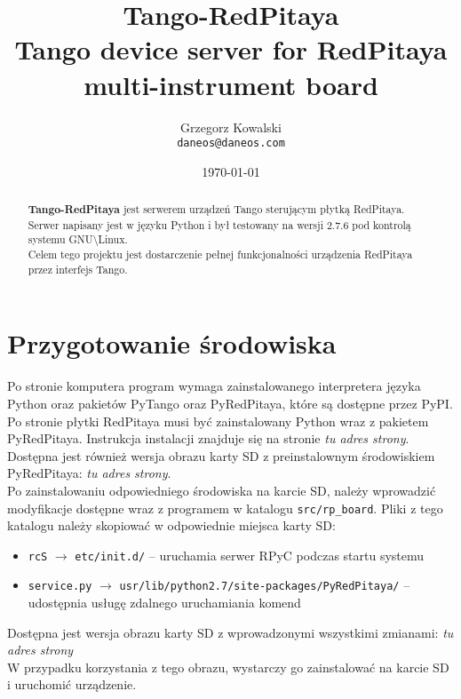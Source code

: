 \documentclass[12pt,a4paper]{article}
\title{Tango-RedPitaya\\\small{Tango device server for RedPitaya multi-instrument board}}
\author{Grzegorz Kowalski\\\texttt{daneos@daneos.com}}
\date{\today}
\begin{document}
	\maketitle
	\vspace{4em}
	
	\begin{abstract}
		\textbf{Tango-RedPitaya} jest serwerem urządzeń Tango sterującym płytką RedPitaya.\\
		Serwer napisany jest w języku Python i był testowany na wersji 2.7.6 pod kontrolą systemu GNU\textbackslash Linux.\\
		Celem tego projektu jest dostarczenie pełnej funkcjonalności urządzenia RedPitaya przez interfejs Tango.
	\end{abstract}

	\newpage
	\section{Przygotowanie środowiska}
	Po stronie komputera program wymaga zainstalowanego interpretera języka Python oraz pakietów PyTango oraz PyRedPitaya, które są dostępne przez PyPI.\\
	Po stronie płytki RedPitaya musi być zainstalowany Python wraz z pakietem PyRedPitaya. Instrukcja instalacji znajduje się na stronie \emph{tu adres strony}.\\
	Dostępna jest również wersja obrazu karty SD z preinstalownym środowiskiem PyRedPitaya: \emph{tu adres strony}.\\
	Po zainstalowaniu odpowiedniego środowiska na karcie SD, należy wprowadzić modyfikacje dostępne wraz z programem w katalogu \texttt{src/rp\_board}.
	Pliki z tego katalogu należy skopiować w odpowiednie miejsca karty SD:
	\begin{itemize}
		\item \texttt{rcS} $\to$ \texttt{etc/init.d/} -- uruchamia serwer RPyC podczas startu systemu
		\item \texttt{service.py} $\to$ \texttt{usr/lib/python2.7/site-packages/PyRedPitaya/} -- udostępnia usługę zdalnego uruchamiania komend
	\end{itemize}
	Dostępna jest wersja obrazu karty SD z wprowadzonymi wszystkimi zmianami: \emph{tu adres strony}\\
	W przypadku korzystania z tego obrazu, wystarczy go zainstalować na karcie SD i uruchomić urządzenie.
\end{document}
